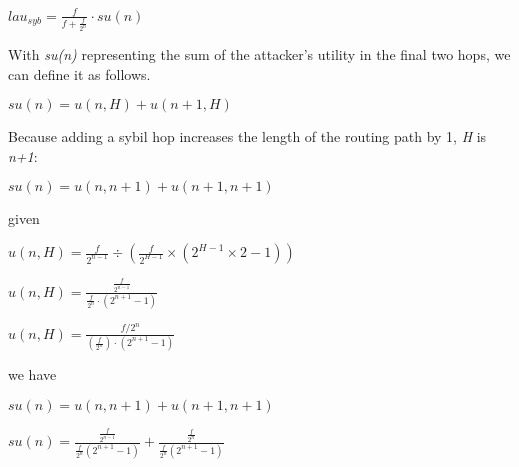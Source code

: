 \documentclass[oneside]{article}   	%
\begin{document}
\begin{multicols}{2}
 \large
\begin{adjustwidth}{1.5em}{1.5em} 
	\begin{math}
lau_{syb} = \frac{f}{f + \frac{f}{2^n}} \cdot su(n)
	\end{math}
\end{adjustwidth}
\normalsize

With \textit{su(n)} representing the sum of the attacker's utility in the final two hops, we can define it as follows.

\large
\begin{adjustwidth}{1.5em}{1.5em} 
	\begin{math}
su(n) = u(n, H) + u(n+1, H)
	\end{math}
\end{adjustwidth}
\normalsize

Because adding a sybil hop increases the length of the routing path by 1, \textit{H} is \textit{n+1}:

\large
\begin{adjustwidth}{1.5em}{1.5em} 
	\begin{math}
su(n) = u(n, n+1) + u(n+1, n+1)
	\end{math}
\end{adjustwidth}
\normalsize

given

\large
\begin{adjustwidth}{1.5em}{1.5em} 
	\begin{math}
u(n,H) = \frac{f}{2^{n-1}} \div \left(\frac{f}{2^{H-1}} \times \left(2^{H-1} \times 2 - 1\right)\right)
	\end{math}

	\begin{math}
u(n,H) = \frac{\frac{f}{2^{n-1}}}{\frac{f}{2^n}\cdot\left(2^{n+1} - 1\right)}
	\end{math}

	\begin{math}
u(n,H) = \frac{f/2^{n}}{\left(\frac{f}{2^n}\right) \cdot \left(2^{n+1} - 1 \right)}
	\end{math}
\end{adjustwidth}
\normalsize

we have

\large
\begin{adjustwidth}{1.5em}{1.5em} 
	\begin{math}
su(n) = u(n, n+1) + u(n+1, n+1)
	\end{math}

	\begin{math}
su(n) =\frac{\frac{f}{2^{n - 1}}}{\frac{f}{2^n} \left(2^{n + 1} - 1 \right)} + \frac{\frac{f}{2^n}}{\frac{f}{2^n} \left(2^{n + 1} - 1 \right)}
	\end{math}
\end{adjustwidth}
\normalsize


\end{multicols}
\end{document}
